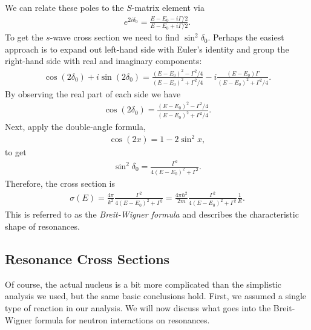 We can relate these poles to the $S$-matrix element via
\begin{align}
  e^{2i\delta_0} = \frac{ E - E_0 - i \Gamma / 2 }{ E - E_0 + i \Gamma / 2 } .
\end{align}
To get the $s$-wave cross section we need to find $\sin^2\delta_0$. Perhaps the easiest approach is to expand out left-hand side with Euler's identity and group the right-hand side with real and imaginary components:
\begin{align}
  \cos(2\delta_0) + i \sin(2\delta_0) = \frac{ ( E - E_0 )^2 - \Gamma^2 / 4 }{ ( E - E_0 )^2 + \Gamma^2 / 4  } - i \frac{ ( E - E_0 ) \Gamma }{ ( E - E_0 )^2 + \Gamma^2 / 4  }.
\end{align}
By observing the real part of each side we have
\begin{align}
  \cos(2\delta_0) = \frac{ ( E - E_0 )^2 - \Gamma^2 / 4 }{ ( E - E_0 )^2 + \Gamma^2 / 4  } . \nonumber
\end{align}
Next, apply the double-angle formula,
\begin{align}
  \cos(2x) = 1 - 2 \sin^2 x, \nonumber
\end{align}
to get
\begin{align}
  \sin^2 \delta_0 = \frac{ \Gamma^2 }{ 4 ( E - E_0 )^2 + \Gamma^2 } .
\end{align}
Therefore, the cross section is
\begin{align}
  \sigma(E) = \frac{4\pi}{k^2}\frac{ \Gamma^2 }{ 4 ( E - E_0 )^2 + \Gamma^2 } =  \frac{4\pi \hbar^2}{2m} \frac{ \Gamma^2 }{ 4 ( E - E_0 )^2 + \Gamma^2 } \frac{1}{E}.
\end{align}
This is referred to as the \emph{Breit-Wigner formula} and describes the characteristic shape of resonances. 

\subsection{Resonance Cross Sections}

Of course, the actual nucleus is a bit more complicated than the simplistic analysis we used, but the same basic conclusions hold. First, we assumed a single type of reaction in our analysis. We will now discuss what goes into the Breit-Wigner formula for neutron interactions on resonances.

